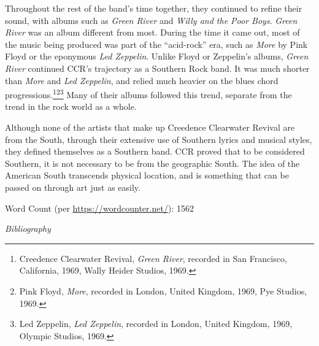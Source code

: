 \documentclass[10pt]{article}
\begin{document}
Throughout the rest of the band's time together, they continued to refine their sound, with albums such as \textit{Green River} and \textit{Willy and the Poor Boys}. \textit{Green River} was an album different from most. During the time it came out, most of the music being produced was part of the ``acid-rock'' era, such as \textit{More} by Pink Floyd or the eponymous \textit{Led Zeppelin}. Unlike Floyd or Zeppelin's albums, \textit{Green River} continued CCR's trajectory as a Southern Rock band. It was much shorter than \textit{More} and \textit{Led Zeppelin}, and relied much heavier on the blues chord progressions.\footnote{Creedence Clearwater Revival, \textit{Green River}, recorded in San Francisco, California, 1969, Wally Heider Studios, 1969.}\footnote{Pink Floyd, \textit{More}, recorded in London, United Kingdom, 1969, Pye Studios, 1969.}\footnote{Led Zeppelin, \textit{Led Zeppelin}, recorded in London, United Kingdom, 1969, Olympic Studios, 1969.} Many of their albums followed this trend, separate from the trend in the rock world as a whole.

Although none of the artists that make up Creedence Clearwater Revival are from the South, through their extensive use of Southern lyrics and musical styles, they defined themselves as a Southern band. CCR proved that to be considered Southern, it is not necessary to be from the geographic South. The idea of the American South transcends physical location, and is something that can be passed on through art just as easily.

\vfill
Word Count (per \url{https://wordcounter.net/}): 1562

\newpage
\singlespacing
\begin{center}
\textit{{\large Bibliography}}
\end{center}
\end{document}
